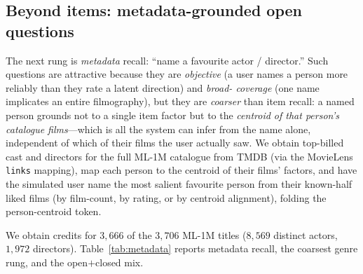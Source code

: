\documentclass[11pt]{article}
\begin{document}
\subsection{Beyond items: metadata-grounded open questions}
\label{sec:metadata}
The next rung is \emph{metadata} recall: ``name a favourite actor / director.'' Such questions are attractive because
they are \emph{objective} (a user names a person more reliably than they rate a latent direction) and \emph{broad-
coverage} (one name implicates an entire filmography), but they are \emph{coarser} than item recall: a named person
grounds not to a single item factor but to the \emph{centroid of that person's catalogue films}---which is all the
system can infer from the name alone, independent of which of their films the user actually saw. We obtain top-billed
cast and directors for the full ML-1M catalogue from TMDB (via the MovieLens \texttt{links} mapping), map each person to
the centroid of their films' factors, and have the simulated user name the most salient favourite person from their
known-half liked films (by film-count, by rating, or by centroid alignment), folding the person-centroid token.

We obtain credits for $3{,}666$ of the $3{,}706$ ML-1M titles ($8{,}569$ distinct actors, $1{,}972$ directors).
Table~\ref{tab:metadata} reports metadata recall, the coarsest genre rung, and the open$+$closed mix.
\end{document}
